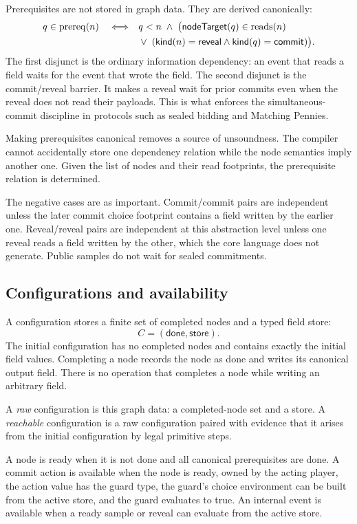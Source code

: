Prerequisites are not stored in graph data.  They are derived
canonically:
\[
\begin{aligned}
  q \in \mathrm{prereq}(n)
  \quad\Longleftrightarrow\quad
  &q < n \;\wedge\;
    \bigl(\mathsf{nodeTarget}(q) \in \mathrm{reads}(n)\\
  &\vee\;
    (\mathsf{kind}(n)=\mathsf{reveal}
     \wedge \mathsf{kind}(q)=\mathsf{commit})\bigr).
\end{aligned}
\]
The first disjunct is the ordinary information dependency: an event
that reads a field waits for the event that wrote the field.  The
second disjunct is the commit/reveal barrier.  It makes a reveal wait
for prior commits even when the reveal does not read their payloads.
This is what enforces the simultaneous-commit discipline in protocols
such as sealed bidding and Matching Pennies.

Making prerequisites canonical removes a source of unsoundness.  The
compiler cannot accidentally store one dependency relation while the node
semantics imply another one.  Given the list of nodes and their read
footprints, the prerequisite relation is determined.

The negative cases are as important.  Commit/commit pairs are
independent unless the later commit choice footprint contains a field written
by the earlier one.  Reveal/reveal pairs are independent at this abstraction
level unless one reveal reads a field written by the other, which the
core language does not generate.  Public samples do not wait for sealed
commitments.

\subsection{Configurations and availability}
\label{sec:eg:configurations}

A configuration stores a finite set of completed nodes and a typed field
store:
\[
  C = (\mathsf{done},\mathsf{store}).
\]
The initial configuration has no completed nodes and contains exactly the
initial field values.  Completing a node records the node as done and
writes its canonical output field.  There is no operation that completes
a node while writing an arbitrary field.

A \emph{raw} configuration is this graph data: a completed-node set and
a store.  A \emph{reachable} configuration is a raw configuration paired
with evidence that it arises from the initial configuration by legal
primitive steps.

A node is ready when it is not done and all canonical prerequisites are
done.  A commit action is available when the node is ready, owned by the
acting player, the action value has the guard type, the guard's choice
environment can be built from the active store, and the guard evaluates
to true.  An internal event is available when a ready sample or reveal can
evaluate from the active store.

